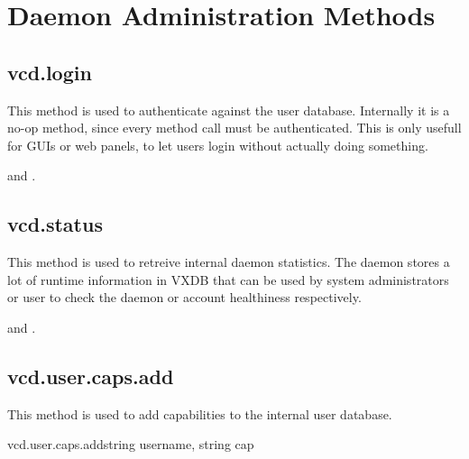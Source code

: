 \chapter{Daemon Administration Methods}
\label{ch:rpcref:vcd}


\section{vcd.login}

This method is used to authenticate against the user database. Internally it is
a no-op method, since every method call must be authenticated. This is only
usefull for GUIs or web panels, to let users login without actually doing
something.


\begin{rpcaccess}
\rpcnocapability and \rpcnoownerchecks.
\end{rpcaccess}

\rpcreturnnil

\rpcnoerrors


\section{vcd.status}

This method is used to retreive internal daemon statistics. The daemon stores a
lot of runtime information in VXDB that can be used by system administrators or
user to check the daemon or account healthiness respectively.


\begin{rpcaccess}
 and \rpcnoownerchecks.
\end{rpcaccess}

\rpcreturnnil

\rpcnoerrors



\section{vcd.user.caps.add}

This method is used to add capabilities to the internal user database.

\begin{rpcsynopsis}{vcd.user.caps.add}{string username, string cap}
\end{rpcsynopsis}

